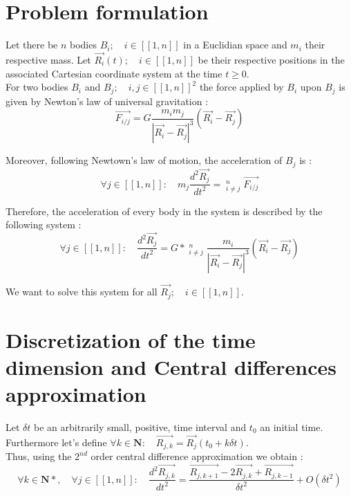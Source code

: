 \documentclass[a4paper,11pt]{article}
\begin{document}
\section{Problem formulation}
Let there be $n$ bodies $B_i;\quad i \in [[1, n]]$ in a Euclidian space and $m_i$
their respective mass.
Let $\vec{R_i}(t);\quad i \in [[1,n]]$ be their respective positions in the associated Cartesian
coordinate system at the time $t \ge 0$.\\
For two bodies $B_i$ and $B_j;\quad i,j \in [[1, n]]^2$ the force applied by $B_i$ upon
$B_j$ is given by Newton's law of universal gravitation :
\begin{equation}
  \vec{F_{i/j}} = G \frac{m_i m_j}{|{\vec{R_i} - \vec{R_j}}|^3} (\vec{R_i} - \vec{R_j})
\end{equation}

Moreover, following Newtown's law of motion, the acceleration of $B_j$ is :
\begin{equation}
  \forall j \in [[1, n]]:\quad m_j \frac{d^2\vec{R_j}}{dt^2} =
  \mathop{\sum_{i=1}}_{i \ne j}^n \vec{F_{i/j}}
\end{equation}

Therefore, the acceleration of every body in the system is described by the following system :
\begin{equation}
  \forall j \in [[1, n]]:\quad \frac{d^2\vec{R_j}}{dt^2} =
  G*\mathop{\sum_{i=1}}_{i \ne j}^n \frac{m_i}{|{\vec{R_i} - \vec{R_j}}|^3} (\vec{R_i} - \vec{R_j})
  \label{odesystem}
\end{equation}

We want to solve this system for all $\vec{R_j}; \quad i \in [[1, n]]$.

\section{Discretization of the time dimension and Central differences approximation}
Let $\delta t$ be an arbitrarily small, positive, time interval and $t_0$ an initial time.
Furthermore let's define $\forall k \in \mathbf{N}:\quad \vec{R_{j,k}} = \vec{R_j}(t_0+k\delta t)$.\\
Thus, using the $2^{nd}$ order central difference approximation we obtain :
\begin{equation}
  \forall k \in \mathbf{N*},\quad \forall j \in [[1, n]]:\quad
  \frac{d^2\vec{R_{j,k}}}{dt^2} = \frac{\vec{R_{j,k+1}} - 2 \vec{R_{j,k}} + \vec{R_{j,k-1}}}{\delta t^2}+ O(\delta t^2)
\end{equation}
\end{document}
